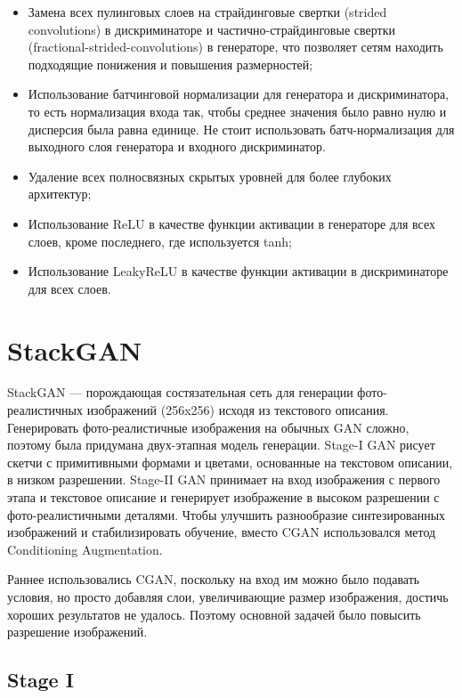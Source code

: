 \documentclass{article}
\theoremstyle{definition}
\theoremstyle{theorem}
\theoremstyle{remark}
\theoremstyle{theorem}
\theoremstyle{example}
\theoremstyle{theorem}
\theoremstyle{theorem}
\theoremstyle{theorem}
\theoremstyle{theorem}
\begin{document}
\begin{itemize}
	\item Замена всех пулинговых слоев на страйдинговые свертки (strided convolutions) в дискриминаторе и частично-страйдинговые свертки (fractional-strided-convolutions) в генераторе, что позволяет сетям находить подходящие понижения и повышения размерностей;
	\item Использование батчинговой нормализации для генератора и дискриминатора, то есть нормализация входа так, чтобы среднее значения было равно нулю и дисперсия была равна единице. Не стоит использовать батч-нормализация для выходного слоя генератора и входного дискриминатор.
	\item Удаление всех полносвязных скрытых уровней для более глубоких архитектур;
	\item Использование ReLU в качестве функции активации в генераторе для всех слоев, кроме последнего, где используется tanh;
	\item Использование LeakyReLU в качестве функции активации в дискриминаторе для всех слоев.
	
\end{itemize}

\section{StackGAN}

StackGAN --- порождающая состязательная сеть для генерации фото-реалистичных изображений (256x256) исходя из текстового описания. Генерировать фото-реалистичные изображения на обычных GAN сложно, поэтому была придумана двух-этапная модель генерации. Stage-I GAN рисует скетчи с примитивными формами и цветами, основанные на текстовом описании, в низком разрешении. Stage-II GAN принимает на вход изображения с первого этапа и текстовое описание и генерирует изображение в высоком разрешении с фото-реалистичными деталями. Чтобы улучшить разнообразие синтезированных изображений и стабилизировать обучение, вместо CGAN использовался метод Conditioning Augmentation.

Раннее использовались CGAN, поскольку на вход им можно было подавать условия, но просто добавляя слои, увеличивающие размер изображения, достичь хороших результатов не удалось. Поэтому основной задачей было повысить разрешение изображений.

\subsection{Stage I}
\end{document}
